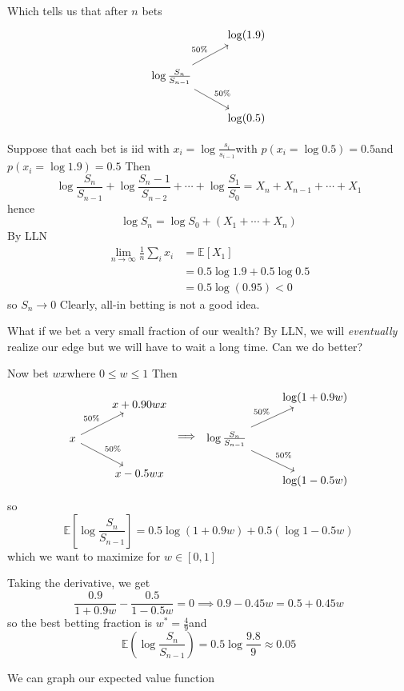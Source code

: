 \documentclass[12pt]{report}
\newcommand{\E}{\mathbb{E}}
\begin{document}
    Which tells us that after $n$ bets  
    \[\begin{tikzcd}
        & \log(1.9)\\ 
        \log \frac{S_n}{S_{n-1}} \arrow["50\%"]{ur} \arrow["50\%"]{dr}  &\\
        & \log(0.5)
    \end{tikzcd}\]

    Suppose that each bet is iid with $x_i = \log \frac{s_i}{s_{i-1}}$with $p(x_i = \log 0.5) = 0.5$and $p(x_i = \log 1.9) = 0.5$ Then 
    \[\log \frac{S_n}{S_{n-1}} + \log \frac{S_n-1}{S_{n-2}} + \cdots + \log \frac{S_1}{S_{0}} = X_n + X_{n-1} + \cdots + X_1\]
    hence 
    \[\log S_n = \log S_0 + (X_1 + \cdots + X_n)\] 
    By LLN 
    \begin{align*}
        \lim_{n \to \infty} \frac{1}{n} \sum_i x_i &= \E[X_1]\\ 
        &= 0.5 \log 1.9 + 0.5 \log 0.5\\
        &= 0.5 \log(0.95) < 0 
    \end{align*}
    so $S_n \to 0$ Clearly, all-in betting is not a good idea. 

    What if we bet a very small fraction of our wealth? By LLN, we will \emph{eventually} realize our edge but we will have to wait a long time. Can we do better?

    Now bet $wx$where $0 \leq w \leq 1$ Then 
    \[\begin{tikzcd}
        & x + 0.90wx\\ 
        x \arrow["50\%"]{ur} \arrow["50\%"]{dr} &\\
        & x - 0.5wx
    \end{tikzcd} \implies \begin{tikzcd}
        & \log(1 + 0.9w)\\
        \log \frac{S_n}{S_{n-1}} \arrow["50\%"]{ur} \arrow["50\%"]{dr} &\\
        & \log(1 - 0.5w)
    \end{tikzcd}\]
    so 
    \[\E[\log \frac{S_n}{S_{n-1}}] = 0.5 \log(1 + 0.9w) + 0.5(\log 1 - 0.5w)\] 
    which we want to maximize for $w \in [0, 1]$

    Taking the derivative, we get 
    \[\frac{0.9}{1  +0.9w} - \frac{0.5}{1 - 0.5w} = 0 \implies 0.9 - 0.45w = 0.5 + 0.45w\]
    so the best betting fraction is $w^* = \frac{4}{9}$and 
    \[\E(\log \frac{S_n}{S_{n-1}}) = 0.5\log \frac{9.8}{9} \approx 0.05\]

    We can graph our expected value function 
\end{document}
